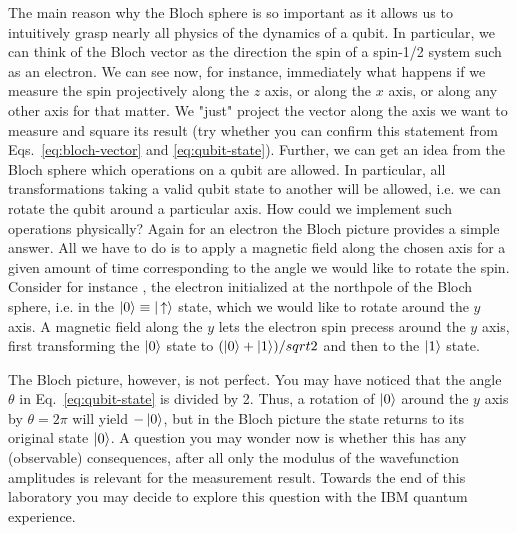 \documentclass{../lab}
\begin{document}
The main reason why the Bloch sphere is so important as it allows us to intuitively grasp nearly all  physics of the dynamics of a qubit. In particular, we can think of the Bloch vector as the direction the spin of a spin-1/2 system such as an electron. We can see now, for instance, immediately what happens if we measure the spin projectively along the $z$ axis, or along the $x$ axis, or along any other axis for that matter. We "just" project the vector along the axis we want to measure and square its result (try whether you can confirm this statement from Eqs.~\ref{eq:bloch-vector} and \ref{eq:qubit-state}).
Further, we can get an idea from the Bloch sphere which operations on a qubit are allowed. In particular, all transformations taking a valid qubit state to another will be allowed, i.e. we can rotate the qubit around a particular axis. How could we implement such operations physically? Again for an electron the Bloch picture provides a simple answer. All we have to do is to apply a magnetic field along the chosen axis for a given amount of time corresponding to the angle we would like to rotate the spin. Consider for instance , the electron initialized at the northpole of the Bloch sphere, i.e. in the $\ket{0}\equiv\ket{\,\uparrow}$ state, which we would like to rotate around the $y$ axis. A magnetic field along the $y$ lets the electron spin precess around the $y$ axis, first transforming the $\ket{0}$ state to $(\ket{0}+\ket{1})/sqrt{2}$ and then to the  $\ket{1}$ state. 

The Bloch picture, however, is not perfect.
You may have noticed that the angle $\theta$ in Eq.~\ref{eq:qubit-state} is divided by 2. Thus, a rotation of $\ket{0}$ around the $y$ axis by $\theta=2\pi$ will yield $-\ket{0}$, but in the Bloch picture the state returns to its original state $\ket{0}$. A question you may wonder now is whether this has any (observable) consequences, after all only the modulus of the wavefunction amplitudes is relevant for the measurement result. Towards the end of this laboratory you may decide to explore this question with the IBM quantum experience. 
\end{document}

